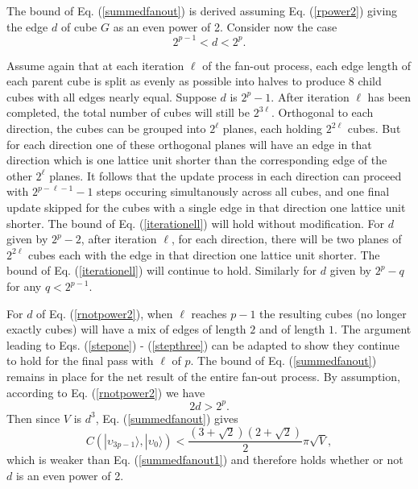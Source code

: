 \documentclass[12pt,amsmath,amssymb,onecolumn]{revtex4-2}
\begin{document}
The bound of Eq. (\ref{summedfanout}) is derived assuming Eq. (\ref{rpower2}) giving the edge $d$ of cube $G$ 
as an even power of 2. Consider now the case
\begin{equation}
\label{rnotpower2}
2^{p-1} < d < 2^p.
\end{equation}

Assume again that at each iteration $\ell$ of the fan-out process, each edge length of each parent cube is
split as evenly as possible into halves to produce 8 child cubes with all edges nearly equal. Suppose
$d$ is $2^p - 1$. After iteration $\ell$ has been completed, the total number
of cubes will still be $2^{3 \ell}$. Orthogonal to each direction, the cubes can be grouped
into $2^\ell$ planes, each holding $2^{2 \ell}$ cubes. But for each direction one of these
orthogonal planes will have an edge in that direction which is one lattice unit shorter than the 
corresponding edge of the other $2^\ell$ planes. It follows that the update process in
each direction can proceed with $2^{p - \ell - 1} - 1$ steps occuring simultanously across all
cubes, and one final update skipped for the cubes with a single edge in that direction one
lattice unit shorter. The bound of Eq. (\ref{iterationell}) will hold without modification.
For $d$ given by  $2^p - 2$, after iteration $\ell$, for each direction, there will be two planes of
$2^{2 \ell}$ cubes each with the edge in that direction one lattice unit shorter. The bound of
Eq. (\ref{iterationell}) will continue to hold. Similarly for $d$ given  by $2^p - q$ for any
$q < 2^{p-1}$. 

For $d$ of Eq. (\ref{rnotpower2}), when $\ell$ reaches $p - 1$ the resulting cubes (no longer exactly cubes)
will have a mix of edges of length $2$ and of length $1$. The argument leading to Eqs. (\ref{stepone}) - (\ref{stepthree})
can be adapted to show they continue to hold for the final pass with $\ell$
of $p$. The bound of Eq. (\ref{summedfanout}) remains in place for the net result of the entire
fan-out process. By assumption, according to Eq. (\ref{rnotpower2}) we have
\begin{equation}
\label{rbound}
2 d > 2^p.
\end{equation}
Then since $V$ is $d^3$, Eq. (\ref{summedfanout}) gives
\begin{equation}
\label{summedfanout2}
C(|\upsilon_{3p-1} \rangle , |\upsilon_0 \rangle ) < \frac{(3 + \sqrt{2})(2 + \sqrt{2})}{2} \pi  \sqrt{V},
\end{equation}
which is weaker than Eq. (\ref{summedfanout1}) and therefore holds whether or not
$d$ is an even power of 2.
\end{document}
